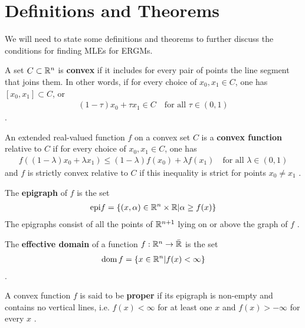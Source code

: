 \section{Definitions and Theorems}

We will need to state some definitions and theorems to further discuss the conditions for finding MLEs for ERGMs.

\begin{definition}
A set $C \subset {\mathbb R}^n$ is \textbf{convex} if it includes for every pair of points the line segment that joins them.  In other words, if for every choice of $x_0, x_1 \in C$, one has $[x_0, x_1] \subset C$, or
\begin{align*}
	(1 - \tau) x_0 + \tau x_1 \in C \quad \text{for all $\tau \in (0,1)$}
\end{align*}
\citep{Rockafellar}.
\end{definition}

\begin{definition}
An extended real-valued function $f$ on a convex set $C$ is a \textbf{convex function} relative to $C$ if for every choice of $x_0, x_1 \in C$, one has 
\begin{align*}
	f( (1-\lambda) x_0 + \lambda x_1) \leq (1- \lambda) f(x_0) + \lambda f(x_1) \quad \text{for all $\lambda \in (0,1)$}
\end{align*}
and $f$ is strictly convex relative to $C$ if this inequality is strict for points $x_0 \neq x_1$
\citep{Rockafellar}.
\end{definition}

\begin{definition}
The \textbf{epigraph} of $f$ is the set
\begin{align*}
	\textrm{epi} f = \{(x, \alpha ) \in {\mathbb R}^n \times {\mathbb R} | \alpha \geq f(x) \}
\end{align*}
The epigraphs consist of all the points of ${\mathbb R}^{n+1}$ lying on or above the graph of $f$
\citep{Rockafellar}.
\end{definition}

\begin{definition}
The \textbf{effective domain} of a function $f:{\mathbb R}^n \to \bar{{\mathbb R}}$ is the set
\begin{align*}
	\operatorname{dom} f = \{ x \in {\mathbb R}^n | f(x) < \infty \}
\end{align*}
\citep{Rockafellar}.
\end{definition}


\begin{definition}
A convex function $f$ is said to be \textbf{proper} if its epigraph is non-empty and contains no vertical lines, i.e. $f(x) < \infty$ for at least one $x$ and $f(x) > - \infty$ for every $x$
\citep{Rockafellar:1970}.
\end{definition}

